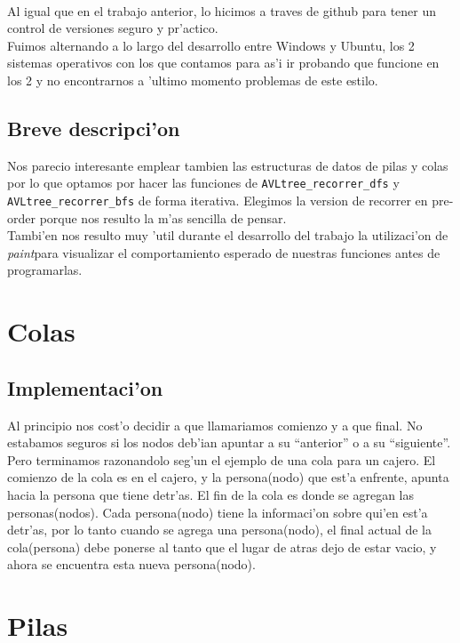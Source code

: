 \documentclass{article}
\begin{document}
			\paragraph{}
			Al igual que en el trabajo anterior, lo hicimos a traves de github para tener un control de versiones seguro y pr'actico.\\
			Fuimos alternando a lo largo del desarrollo entre Windows y Ubuntu, los 2 sistemas operativos con los que contamos para as'i ir probando que funcione en los 2 y no encontrarnos a 'ultimo momento problemas de este estilo.
			
		\subsection{Breve descripci'on}
			Nos parecio interesante emplear tambien las estructuras de datos de pilas y colas por lo que optamos por hacer las funciones de \lstinline|AVLtree_recorrer_dfs| y \lstinline|AVLtree_recorrer_bfs| de forma iterativa. Elegimos la version de recorrer en pre-order porque nos resulto la m'as sencilla de pensar.
			\\
			Tambi'en nos resulto muy 'util durante el desarrollo del trabajo la utilizaci'on de \emph{paint}para visualizar el comportamiento esperado de nuestras funciones antes de programarlas.
			
	\section{Colas}
		\subsection{Implementaci'on}
			Al principio nos cost'o decidir a que llamariamos comienzo y a que final. No estabamos seguros si los nodos deb'ian apuntar a su ``anterior'' o a su ``siguiente''. Pero terminamos razonandolo seg'un el ejemplo de una cola para un cajero. El comienzo de la cola es en el cajero, y la persona(nodo) que est'a enfrente, apunta hacia la persona que tiene detr'as. El fin de la cola es donde se agregan las personas(nodos). Cada persona(nodo) tiene la informaci'on sobre qui'en est'a detr'as, por lo tanto cuando se agrega una persona(nodo), el final actual de la cola(persona) debe ponerse al tanto que el lugar de atras dejo de estar vacio, y ahora se encuentra esta nueva persona(nodo).
			
	\section{Pilas}
\end{document}
